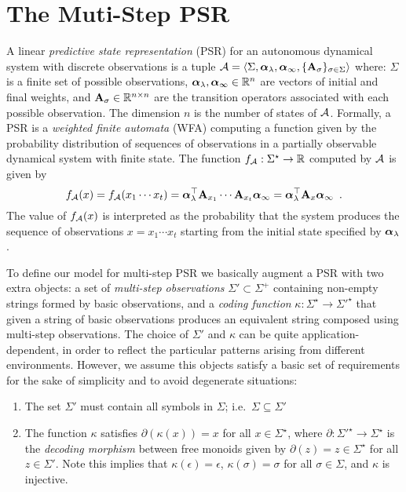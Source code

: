 \section{The Muti-Step PSR}

A linear \emph{predictive state representation} (PSR) for an autonomous dynamical system with discrete observations is a tuple $\mathcal{A} = \langle \Sigma, \boldsymbol{\alpha}_\lambda, \boldsymbol{\alpha}_{\infty}, \{\mathbf{A}_\sigma\}_{\sigma \in \Sigma} \rangle$ where: $\Sigma$ is a finite set of possible observations, $\boldsymbol{\alpha}_\lambda, \boldsymbol{\alpha}_{\infty} \in \mathbb{R}^n$ are vectors of initial and final weights, and $\mathbf{A}_\sigma \in \mathbb{R}^{n \times n}$ are the transition operators associated with each possible observation. The dimension $n$ is the number of states of $\mathcal{A}$. Formally, a PSR is a \emph{weighted finite automata} (WFA) \cite{BLA} computing a function given by the probability distribution of sequences of observations in a partially observable dynamical system with finite state. The function $f_{\mathcal{A}} : \Sigma^\star \to \mathbb{R}$ computed by $\mathcal{A}$ is given by
\begin{equation*}
f_{\mathcal{A}}(x) = f_{\mathcal{A}}(x_1 \cdots x_t) = \boldsymbol{\alpha}_\lambda^\top \mathbf{A}_{x_1} \cdots \mathbf{A}_{x_t} \boldsymbol{\alpha}_{\infty} = \boldsymbol{\alpha}_\lambda^\top \mathbf{A}_x \boldsymbol{\alpha}_{\infty} \enspace.
\end{equation*}
The value of $f_{\mathcal{A}}(x)$ is interpreted as the probability that the system produces the sequence of observations $x = x_1 \cdots x_t$ starting from the initial state specified by $\boldsymbol{\alpha}_\lambda$.

To define our model for multi-step PSR we basically augment a PSR with two extra objects: a set of \emph{multi-step observations} $\Sigma' \subset \Sigma^+$ containing non-empty strings formed by basic observations, and a \emph{coding function} $\kappa : \Sigma^\star \to {\Sigma'}^{\star}$ that given a string of basic observations produces an equivalent string composed using multi-step observations.
%
The choice of $\Sigma'$ and $\kappa$ can be quite application-dependent, in order to reflect the particular patterns arising from different environments. However, we assume this objects satisfy a basic set of requirements for the sake of simplicity and to avoid degenerate situations:
\begin{enumerate}
\item The set $\Sigma'$ must contain all symbols in $\Sigma$; i.e.\ $\Sigma \subseteq \Sigma'$
\item The function $\kappa$ satisfies $\partial(\kappa(x)) = x$ for all $x \in \Sigma^\star$, where $\partial : {\Sigma'}^\star \to \Sigma^\star$ is the \emph{decoding morphism} between free monoids given by $\partial(z) = z \in \Sigma^\star$ for all $z \in \Sigma'$. Note this implies that $\kappa(\epsilon) = \epsilon$, $\kappa(\sigma) = \sigma$ for all $\sigma \in \Sigma$, and $\kappa$ is injective.
\end{enumerate}

